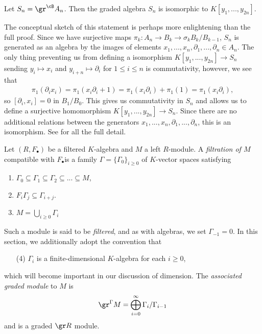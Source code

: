 \begin{example}\label{example:graded-algebra-of-Weyl-algebra}
	Let $S_n = \gr^\cB A_n$. Then the graded algebra $S_n$ is isomorphic to $K[y_1,...,y_{2n}]$. 

	The conceptual sketch of this statement is perhaps more enlightening than the full proof. Since we have surjective maps $\pi_k:A_n\to B_k \to{\sigma_k} B_k/B_{k-1}$, $S_n$ is generated as an algebra by the images of elements $x_1,...,x_n,\partial_1,...,\partial_n \in A_n$. The only thing preventing us from defining a isomorphism $K[y_1,...,y_{2n}]\to S_n$ sending $y_i\mapsto x_i$ and $y_{i+n}\mapsto \partial_{i}$ for $1\leq i\leq n$ is commutativity, however, we see that
	\begin{align*}
		\pi_1(\partial_i x_i) = \pi_1(x_i\partial_i + 1) = \pi_1(x_i\partial_i) + \pi_1(1) = \pi_1(x_i\partial_i),
	\end{align*}
	so $[\partial_i,x_i] = 0$ in $B_1/B_0$. This gives us commutativity in $S_n$ and allows us to define a surjective homomorphism $K[y_1,...,y_{2n}] \to S_n$. Since there are no additional relations between the generators $x_1,...,x_n,\partial_1,...,\partial_n$, this is an isomorphism. See \cite[pg. 58]{d-mod-primer} for all the full detail.
\end{example}

\begin{defn}\label{defn:filtered-module}
	Let $(R,F_\bullet)$ be a filtered $K$-algebra and $M$ a left $R$-module. A \emph{filtration of $M$} compatible with $F_\bullet$is a family $\Gamma = \{\Gamma_0\}_{i\geq 0}$ of $K$-vector spaces satisfying
	\begin{enumerate}[(1)]
		\item $\Gamma_0 \subseteq \Gamma_1 \subseteq \Gamma_2 \subseteq ... \subseteq M$,
		\item $F_i\Gamma_j \subseteq \Gamma_{i+j}$.
		\item $M = \bigcup_{i\geq 0} \Gamma_i$
	\end{enumerate}
	Such a module is said to be \emph{filtered}, and as with algebras, we set $\Gamma_{-1} = 0$. In this section, we additionally adopt the convention that
	\begin{enumerate}
		\item[(4)] $\Gamma_i$ is a finite-dimensional $K$-algebra for each $i \geq 0$,
	\end{enumerate}
	which will become important in our discussion of dimension. The \emph{associated graded module} to $M$ is
	\begin{align*}
		\gr^{\Gamma} M = \bigoplus_{i=0}^\infty \Gamma_i/\Gamma_{i-1}
	\end{align*}
	and is a graded $\gr R$ module.
\end{defn}

